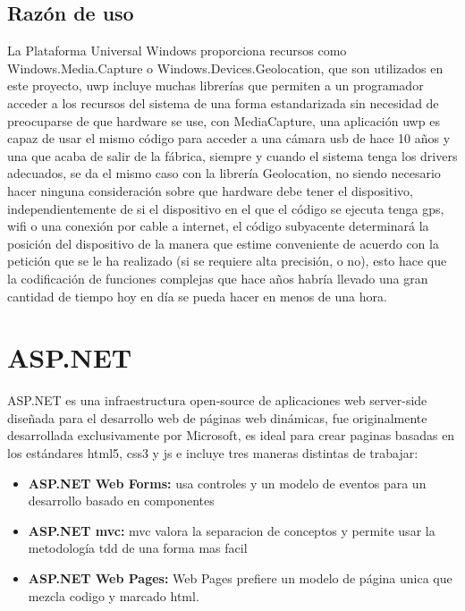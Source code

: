 \FloatBarrier

\subsection{Razón de uso}

La Plataforma Universal Windows proporciona recursos como Windows.Media.Capture o Windows.Devices.Geolocation, que son utilizados en este proyecto, \acrshort{uwp} incluye muchas librerías que permiten a un programador acceder a los recursos del sistema de una forma estandarizada sin necesidad de preocuparse de que hardware se use, con MediaCapture, una aplicación \acrshort{uwp} es capaz de usar el mismo código para acceder a una cámara \acrshort{usb} de hace 10 años y una que acaba de salir de la fábrica, siempre y cuando el sistema tenga los drivers adecuados, se da el mismo caso con la librería Geolocation, no siendo necesario hacer ninguna consideración sobre que hardware debe tener el dispositivo, independientemente de si el dispositivo en el que el código se ejecuta tenga \acrshort{gps}, \acrshort{wifi} o una conexión por cable a internet, el código subyacente determinará la posición del dispositivo de la manera que estime conveniente de acuerdo con la petición que se le ha realizado (si se requiere alta precisión, o no), esto hace que la codificación de funciones complejas que hace años habría llevado una gran cantidad de tiempo hoy en día se pueda hacer en menos de una hora.




\section{ASP.NET}

ASP.NET\cite{asp.net} es una infraestructura open-source de aplicaciones web server-side diseñada para el desarrollo web de páginas web dinámicas, fue originalmente desarrollada exclusivamente por Microsoft, es ideal para crear paginas basadas en los estándares \acrshort{html}5, \acrshort{css}3 y \acrfull{js} e incluye tres maneras distintas de trabajar:

\begin{itemize}

\item \textbf{ASP.NET Web Forms:} usa controles y un modelo de eventos para un desarrollo basado en componentes

\item \textbf{ASP.NET \acrshort{mvc}:} \acrshort{mvc} valora la separacion de conceptos y permite usar la metodología \acrshort{tdd} de una forma mas facil

\item \textbf{ASP.NET Web Pages:} Web Pages prefiere un modelo de página unica que mezcla codigo y marcado \acrshort{html}.

\end{itemize}

